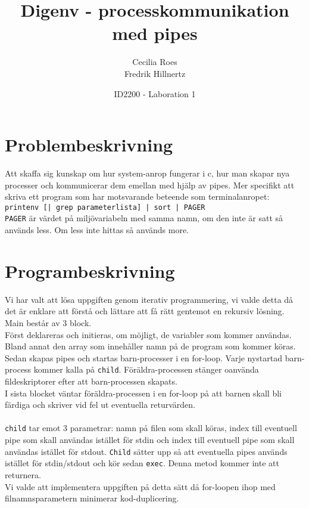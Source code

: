 \documentclass[a4paper]{article}
\title{Digenv - processkommunikation med pipes}
\date{ID2200 - Laboration 1}
\author{Cecilia Roes \\ Fredrik Hillnertz}
\begin{document}

\maketitle

\section*{Problembeskrivning}
Att skaffa sig kunskap om hur system-anrop fungerar i c, hur man skapar nya processer och kommunicerar dem emellan med hjälp av pipes.
Mer specifikt att skriva ett program som har motsvarande beteende som terminalanropet: \texttt{printenv [| grep parameterlista] | sort | PAGER}
\\
\texttt{PAGER} är värdet på miljövariabeln med samma namn, om den inte är satt så används less. Om less inte hittas så används more.

\section*{Programbeskrivning}
Vi har valt att lösa uppgiften genom iterativ programmering, vi valde detta då det är enklare att förstå och lättare att få rätt gentemot en rekursiv lösning.
\\
Main består av 3 block.
\\
Först deklareras och initieras, om möjligt, de variabler som kommer användas. Bland annat den array som innehåller namn på de program som kommer köras.
\\
Sedan skapas pipes och startas barn-processer i en for-loop. Varje nystartad barn-process kommer kalla på \texttt{child}. Föräldra-processen stänger oanvända fildeskriptorer efter att barn-processen skapats.
\\
I sista blocket väntar föräldra-processen i en for-loop på att barnen skall bli färdiga och skriver vid fel ut eventuella returvärden.
\\
\\
\texttt{child} tar emot 3 parametrar: namn på filen som skall köras, index till eventuell pipe som skall användas istället för stdin och index till eventuell pipe som skall användas istället för stdout. \texttt{Child} sätter upp så att eventuella pipes används istället för stdin/stdout och kör sedan \texttt{exec}. Denna metod kommer inte att returnera.
\\
Vi valde att implementera uppgiften på detta sätt då for-loopen ihop med filnamnsparametern minimerar kod-duplicering.
\end{document}
